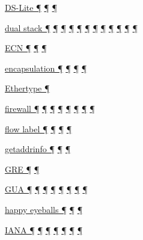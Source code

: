 \documentclass[
]{article}
\begin{document}
\hyperref[dual-stack-scenarios]{DS-Lite ¶}
\hyperref[translation-and-ipv4-as-a-service]{¶} \hyperref[tunnels]{¶}

\hyperref[how-an-application-programmer-sees-ipv6]{dual stack ¶}
\hyperref[routing]{¶} \hyperref[transport-protocols]{¶}
\hyperref[coexistence-with-legacy-ipv4]{¶}
\hyperref[dual-stack-scenarios]{¶}
\hyperref[translation-and-ipv4-as-a-service]{¶} \hyperref[tunnels]{¶}
\hyperref[network-design]{¶} \hyperref[address-and-prefix-management]{¶}
\hyperref[energy-consumption]{¶} \hyperref[cern-and-the-lhc]{¶}
\hyperref[deployment-in-the-home]{¶}

\hyperref[packet-format]{ECN ¶}
\hyperref[traffic-class-and-flow-label]{¶}
\hyperref[transport-protocols]{¶}

\hyperref[layer-2-functions]{encapsulation ¶}
\hyperref[dual-stack-scenarios]{¶}
\hyperref[translation-and-ipv4-as-a-service]{¶} \hyperref[tunnels]{¶}

\hyperref[layer-2-functions]{Ethertype ¶}

\hyperref[extension-headers-and-options]{firewall ¶}
\hyperref[dual-stack-scenarios]{¶} \hyperref[security]{¶}
\hyperref[topology-obfuscation]{¶} \hyperref[network-design]{¶}
\hyperref[address-and-prefix-management]{¶}
\hyperref[benchmarking-and-monitoring]{¶} \hyperref[multihoming]{¶}

\hyperref[packet-format]{flow label ¶} \hyperref[routing]{¶}
\hyperref[traffic-class-and-flow-label]{¶} \hyperref[markdown-usage]{¶}

\hyperref[how-an-application-programmer-sees-ipv6]{getaddrinfo ¶}
\hyperref[dns]{¶} \hyperref[dual-stack-scenarios]{¶}

\hyperref[layer-2-functions]{GRE ¶} \hyperref[tunnels]{¶}

\hyperref[addresses]{GUA ¶} \hyperref[auto-configuration]{¶}
\hyperref[source-and-destination-address-selection]{¶}
\hyperref[ipv6-primary-differences-from-ipv4]{¶}
\hyperref[translation-and-ipv4-as-a-service]{¶}
\hyperref[topology-obfuscation]{¶} \hyperref[address-planning]{¶}
\hyperref[multi-prefix-operation]{¶}

\hyperref[how-an-application-programmer-sees-ipv6]{happy eyeballs ¶}
\hyperref[multihoming]{¶} \hyperref[deployment-in-the-home]{¶}

\hyperref[why-version-6]{IANA ¶} \hyperref[addresses]{¶}
\hyperref[auto-configuration]{¶}
\hyperref[extension-headers-and-options]{¶}
\hyperref[managed-configuration]{¶} \hyperref[packet-format]{¶}
\hyperref[filtering]{¶}
\end{document}
